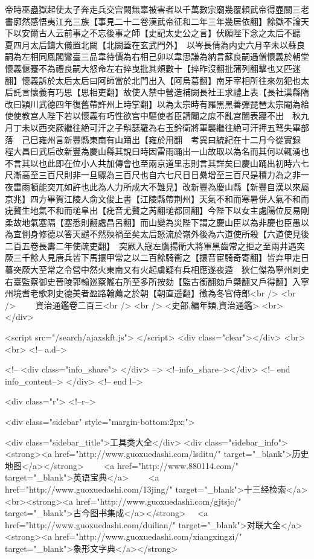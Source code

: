 帝時巫蠱獄起使太子奔走兵交宫闕無辜被害者以千萬數宗廟幾覆賴武帝得壺關三老書廓然感悟夷江充三族【事見二十二卷漢武帝征和二年三年幾居依翻】餘獄不論天下以安爾古人云前事之不忘後事之師【史記太史公之言】伏願陛下念之太后不聽　夏四月太后鑄大儀置北闕【北闕蓋在玄武門外】　以岑長倩為内史六月辛未以蘇良嗣為左相同鳳閣鸞臺三品韋待價為右相己卯以韋思謙為納言蘇良嗣遇僧懷義於朝堂懷義偃蹇不為禮良嗣大怒命左右捽曳批其頰數十【捽昨沒翻批蒲列翻擊也又匹迷翻】懷義訴於太后太后曰阿師當於北門出入【阿烏葛翻】南牙宰相所往來勿犯也太后託言懷義有巧思【思相吏翻】故使入禁中營造補闕長社王求禮上表【長社漢縣隋改曰穎川武德四年復舊帶許州上時掌翻】以為太宗時有羅黑黑善彈琵琶太宗閹為給使使教宫人陛下若以懷義有巧性欲宫中驅使者臣請閹之庶不亂宫闈表寢不出　秋九月丁未以西突厥繼往絶可汗之子斛瑟羅為右玉鈐衛將軍襲繼往絶可汗押五弩失畢部落　己巳雍州言新豐縣東南有山踊出【雍於用翻　考異曰統紀在十二月今從實録　程大昌曰武后改新豐為慶山縣其說曰時因雷雨踊出一山故取以為名而其何以輒湧也不言其以也此即在位小人共加傳會也至兩京道里志則言其詳矣曰慶山踊出初時六七尺漸高至三百尺則非一旦驟為三百尺也自六七尺日日纍增至三百尺是積力為之非一夜雷雨頓能突兀如許也此為人力所成大不難見】改新豐為慶山縣【新豐自漢以來屬京兆】四方畢賀江陵人俞文俊上書【江陵縣帶荆州】天氣不和而寒暑併人氣不和而疣贅生地氣不和而塠阜出【疣音尤贅之芮翻塠都回翻】今陛下以女主處陽位反易剛柔故地氣塞隔【塞悉則翻處昌呂翻】而山變為災陛下謂之慶山臣以為非慶也臣愚以為宜側身修德以答天譴不然殃禍至矣太后怒流於嶺外後為六道使所殺【六道使見後二百五卷長夀二年使疏吏翻】　突厥入寇左鷹揚衛大將軍黑齒常之拒之至兩井遇突厥三千餘人見唐兵皆下馬擐甲常之以二百餘騎衝之【擐音宦騎奇寄翻】皆弃甲走日暮突厥大至常之令營中然火東南又有火起虜疑有兵相應遂夜遁　狄仁傑為寧州刺史右臺監察御史晉陵郭翰廵察隴右所至多所按劾【監古銜翻劾戶槩翻又戶得翻】入寧州境耆老歌刺史德美者盈路翰薦之於朝【朝直遥翻】徵為冬官侍郎<br />
<br />
　　資治通鑑卷二百三<br />
<br />
<史部,編年類,資治通鑑>  <br>
   </div> 

<script src="/search/ajaxskft.js"> </script>
 <div class="clear"></div>
<br>
<br>
 <!-- a.d-->

 <!--
<div class="info_share">
</div> 
-->
 <!--info_share--></div>   <!-- end info_content-->
  </div> <!-- end l-->

<div class="r">   <!--r-->



<div class="sidebar"  style="margin-bottom:2px;">

 
<div class="sidebar_title">工具类大全</div>
<div class="sidebar_info">
<strong><a href="http://www.guoxuedashi.com/lsditu/" target="_blank">历史地图</a></strong>　　
<a href="http://www.880114.com/" target="_blank">英语宝典</a>　　
<a href="http://www.guoxuedashi.com/13jing/" target="_blank">十三经检索</a>　
<br><strong><a href="http://www.guoxuedashi.com/gjtsjc/" target="_blank">古今图书集成</a></strong>　
<a href="http://www.guoxuedashi.com/duilian/" target="_blank">对联大全</a>　<strong><a href="http://www.guoxuedashi.com/xiangxingzi/" target="_blank">象形文字典</a></strong>　

